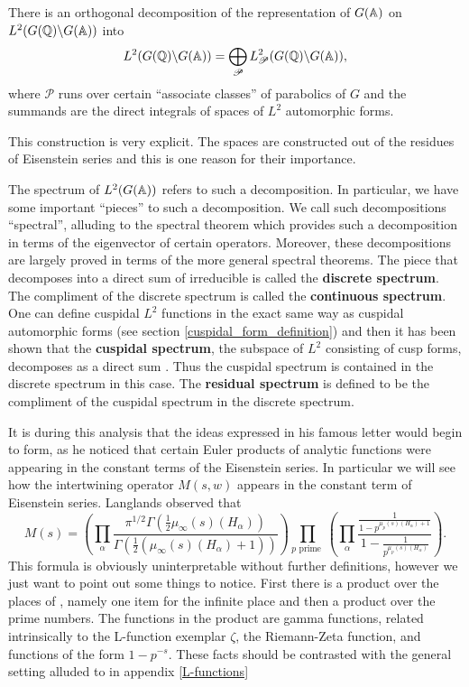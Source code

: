 \begin{Theorem}
	There is an orthogonal decomposition of the representation of \(G(\A)\) on \(L^2(G(\Q) \backslash G(\A))\) into 
	\[L^2(G(\Q) \backslash G(\A)) = \bigoplus_{\mathscr{P}}L^2_\mathscr{P}(G(\Q) \backslash G(\A)),\]
	where \(\mathscr{P}\) runs over certain ``associate classes'' of parabolics of \(G\) and the summands are the direct integrals of spaces of \(L^2\) automorphic forms.
\end{Theorem}
This construction is very explicit. The spaces are constructed out of the residues of Eisenstein series and this is one reason for their importance. 

The spectrum of \(L^2(G(\A))\) refers to such a decomposition. In particular, we have some important ``pieces'' to such a decomposition. We call such decompositions ``spectral'', alluding to the spectral theorem which provides such a decomposition in terms of the eigenvector of certain operators. Moreover, these decompositions are largely proved in terms of the more general spectral theorems. The piece that decomposes into a direct sum of irreducible is called the \textbf{discrete spectrum}. The compliment of the discrete spectrum is called the \textbf{continuous spectrum}. One can define cuspidal \(L^2\) functions in the exact same way as cuspidal automorphic forms (see section \ref{cuspidal_form_definition}) and then it has been shown that the \textbf{cuspidal spectrum}, the subspace of \(L^2\) consisting of cusp forms, decomposes as a direct sum \cite[9]{getzIntroductionAutomorphicRepresentations2024}. Thus the cuspidal spectrum is contained in the discrete spectrum in this case. The \textbf{residual spectrum} is defined to be the compliment of the cuspidal spectrum in the discrete spectrum. 

It is during this analysis that the ideas expressed in his famous letter \cite{langlandsLetterAndreWeil1967} would begin to form, as he noticed that certain Euler products of analytic functions were appearing in the constant terms of the Eisenstein series. In particular we will see how the intertwining operator \(M(s, w)\) appears in the constant term of Eisenstein series. Langlands observed that \cite{langlandsEulerProducts1971} 
\[M(s) = \left( \prod_\alpha\frac{\pi^{1/2}\Gamma(\frac{1}{2}\mu_\infty(s)(H_\alpha))}{\Gamma(\frac{1}{2}(\mu_\infty(s)(H_\alpha) + 1))} \right)\prod_{p \text{ prime }} \left( \prod_\alpha \frac{\frac{1}{1 - p^{\mu_p(s)(H_\alpha) + 1}}}{1 - \frac{1}{p^{\mu_p(s)(H_\alpha) }}}\right).\]
This formula is obviously uninterpretable without further definitions, however we just want to point out some things to notice. First there is a product over the places of \Q, namely one item for the infinite place and then a product over the prime numbers. The functions in the product are gamma functions, related intrinsically to the L-function exemplar \(\zeta\), the Riemann-Zeta function, and functions of the form \(1 - p^{-s}\). These facts should be contrasted with the general setting alluded to in appendix \ref{L-functions}

